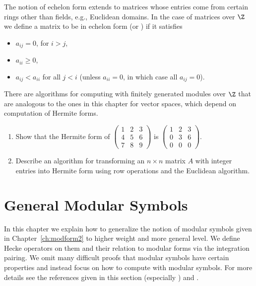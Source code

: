 \begin{exercises}
\item \label{ex:hnf} The notion of echelon form extends to
  matrices whose entries come from certain rings other than fields,
  e.g., Euclidean domains.  In the case of 
  matrices over $\Z$ we define a matrix to be in echelon
form (or )  if it satisfies
\begin{itemize}
  \item $a_{ij}=0$, for $i>j$,
  \item $a_{ii}\geq 0$,
  \item $a_{ij}<a_{ii}$ for all $j<i$ (unless $a_{ii}=0$, in 
which case all $a_{ij}=0$).
\end{itemize}
There are algorithms for computing with finitely generated
modules over $\Z$ that are analogous to the ones in this chapter
for vector spaces, which depend on computation of Hermite 
forms. 
\begin{enumerate}
  \item Show that the Hermite form of 
$\left(\begin{matrix}1&2&3\\4&5&6\\7&8&9\end{matrix}\right)$ is 
$\left(\begin{matrix}1&2&3\\0&3&6\\0&0&0\end{matrix}\right)$.
\item Describe an algorithm for transforming
  an $n\times n$ matrix $A$ with integer entries 
into Hermite form using row
  operations and the Euclidean algorithm.
\end{enumerate}


\end{exercises}















\chapter{General Modular Symbols}\label{ch:modsym}

In this chapter we explain how to generalize the notion of modular
symbols given in Chapter~\ref{ch:modform2} to higher weight and more
general level.  We define Hecke operators on them and their relation to
modular forms via the integration pairing.  We omit many difficult 
proofs that modular symbols have certain properties and instead
focus on how to compute with modular symbols.  For more details
see the references given in this section (especially \cite{merel:1585})
and  \cite{gabor:phd}.

